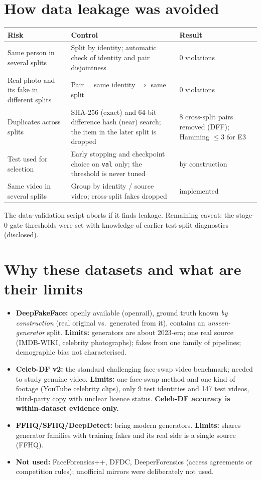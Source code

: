 \documentclass[11pt,a4paper]{report}
\newcommand{\code}[1]{\texttt{\detokenize{#1}}}
\begin{document}
\section{How data leakage was avoided}
\begin{center}
\small
\begin{tabular}{|p{4.4cm}|p{6.2cm}|p{3.6cm}|}
\hline
\textbf{Risk} & \textbf{Control} & \textbf{Result}\\\hline
Same person in several splits & Split by identity; automatic check of identity and pair disjointness & 0 violations\\\hline
Real photo and its fake in different splits & Pair = same identity $\Rightarrow$ same split & 0 violations\\\hline
Duplicates across splits & SHA-256 (exact) and 64-bit difference hash (near) search; the item in the later split is dropped & 8 cross-split pairs removed (DFF); Hamming $\le3$ for E3\\\hline
Test used for selection & Early stopping and checkpoint choice on \texttt{val} only; the threshold is never tuned & by construction\\\hline
Same video in several splits & Group by identity / source video; cross-split fakes dropped & implemented\\\hline
\end{tabular}
\end{center}
The data-validation script aborts if it finds leakage. Remaining caveat: the stage-0 gate thresholds were set with knowledge of earlier test-split diagnostics (disclosed).

\section{Why these datasets and what are their limits}
\begin{itemize}
\item \textbf{DeepFakeFace:} openly available (openrail), ground truth known \emph{by construction} (real original vs.\ generated from it), contains an \emph{unseen-generator} split. \textbf{Limits:} generators are about 2023-era; one real source (IMDB-WIKI, celebrity photographs); fakes from one family of pipelines; demographic bias not characterised.
\item \textbf{Celeb-DF v2:} the standard challenging face-swap video benchmark; needed to study genuine video. \textbf{Limits:} one face-swap method and one kind of footage (YouTube celebrity clips), only 9 test identities and 147 test videos, third-party copy with unclear licence status. \textbf{Celeb-DF accuracy is within-dataset evidence only.}
\item \textbf{FFHQ/SFHQ/DeepDetect:} bring modern generators. \textbf{Limits:} \code{modern_test} shares generator families with training fakes and its real side is a single source (FFHQ).
\item \textbf{Not used:} FaceForensics++, DFDC, DeeperForensics (access agreements or competition rules); unofficial mirrors were deliberately not used.
\end{itemize}
\end{document}
